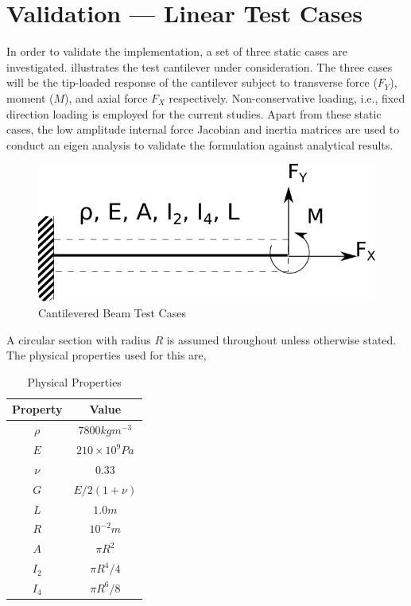 \documentclass[10pt]{article}
\begin{document}
\pagebreak
\section{Validation --- Linear Test Cases}
\label{sec:valid-line-test}

In order to validate the implementation, a set of three static cases
are investigated.  illustrates the test cantilever
under consideration. The three cases will be the tip-loaded response
of the cantilever subject to transverse force ($F_Y$), moment ($M$),
and axial force $F_X$ respectively. Non-conservative loading, i.e.,
fixed direction loading is employed for the current studies. Apart
from these static cases, the low amplitude internal force Jacobian and
inertia matrices are used to conduct an eigen analysis to validate the
formulation against analytical results.

\begin{figure}[!h]
  \centering
  \includegraphics[width=0.4\linewidth]{FIGS/cantilever}
  \caption{Cantilevered Beam Test Cases}
  \label{fig:cbeam}
\end{figure}

A circular section with radius $R$ is assumed throughout unless
otherwise stated. The physical properties used for this are,
\begin{table}[!h]
  \centering
  \begin{tabular}{cc}
    \hline\hline
    Property & Value\\\hline
    $\rho$ & $7800 kgm^{-3}$\\
    $E$ & $210\times 10^9Pa$\\
    $\nu$ & $0.33$\\
    $G$ & $E/2(1+\nu)$\\
    $L$ & $1.0 m$\\
    $R$ & $10^{-2}m$\\
    $A$ & $\pi R^2$\\
    $I_2$ & $\pi R^4/4$\\
    $I_4$ & $\pi R^6/8$\\\hline\hline
  \end{tabular}
  \caption{Physical Properties}
  \label{tab:physicalprops}
\end{table}
\end{document}
